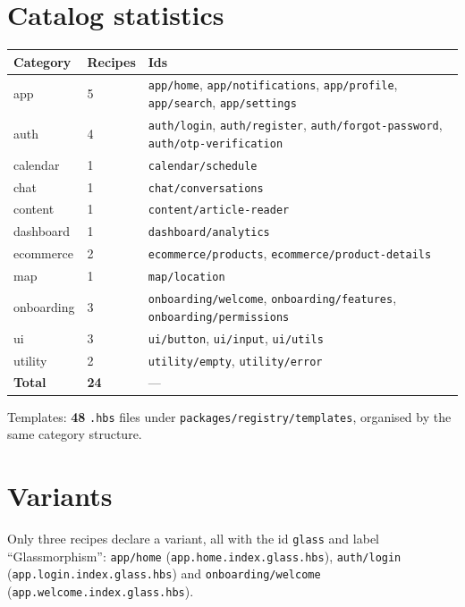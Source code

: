 \section{Catalog statistics}

\begin{table}[H]
\centering
\caption{Catalog composition (verified)}
\begin{longtable}{@{}L{3.2cm}L{1.6cm}L{9cm}@{}}
\toprule
\textbf{Category} & \textbf{Recipes} & \textbf{Ids} \\
\midrule
\endhead
app & 5 & \texttt{app/home}, \texttt{app/notifications}, \texttt{app/profile},
\texttt{app/search}, \texttt{app/settings} \\
auth & 4 & \texttt{auth/login}, \texttt{auth/register},
\texttt{auth/forgot-password}, \texttt{auth/otp-verification} \\
calendar & 1 & \texttt{calendar/schedule} \\
chat & 1 & \texttt{chat/conversations} \\
content & 1 & \texttt{content/article-reader} \\
dashboard & 1 & \texttt{dashboard/analytics} \\
ecommerce & 2 & \texttt{ecommerce/products}, \texttt{ecommerce/product-details} \\
map & 1 & \texttt{map/location} \\
onboarding & 3 & \texttt{onboarding/welcome}, \texttt{onboarding/features},
\texttt{onboarding/permissions} \\
ui & 3 & \texttt{ui/button}, \texttt{ui/input}, \texttt{ui/utils} \\
utility & 2 & \texttt{utility/empty}, \texttt{utility/error} \\
\midrule
\textbf{Total} & \textbf{24} & --- \\
\bottomrule
\end{longtable}
\end{table}

Templates: \textbf{48} \texttt{.hbs} files under
\texttt{packages/registry/templates}, organised by the same category structure.

\section{Variants}

Only three recipes declare a variant, all with the id \texttt{glass} and label
``Glassmorphism'':
\texttt{app/home} (\texttt{app.home.index.glass.hbs}),
\texttt{auth/login} (\texttt{app.login.index.glass.hbs}) and
\texttt{onboarding/welcome} (\texttt{app.welcome.index.glass.hbs}).

